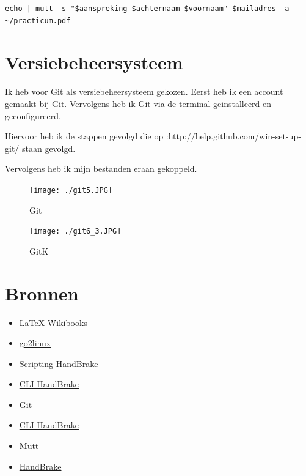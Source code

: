 \documentclass[12pt,a4paper]{article}
\begin{document}
\begin{titlepage}
\begin{center}
\begin{verbatim}
echo | mutt -s "$aanspreking $achternaam $voornaam" $mailadres -a ~/practicum.pdf

\end{verbatim}

\section{Versiebeheersysteem}
Ik heb voor Git als versiebeheersysteem gekozen.
Eerst heb ik een account gemaakt bij Git. Vervolgens heb ik Git via de terminal geinstalleerd en geconfigureerd.

Hiervoor heb ik de stappen gevolgd die op :http://help.github.com/win-set-up-git/ staan gevolgd.

Vervolgens heb ik mijn bestanden eraan gekoppeld.

\begin{figure}[h]
\begin{center}

\texttt{[image: ./git5.JPG]}
\caption{\label{fig4}Git}
\end{center}
\end{figure}

\begin{figure}[h]
\begin{center}

\texttt{[image: ./git6\_3.JPG]}
\caption{\label{fig5}GitK}
\end{center}
\end{figure}

\section{Bronnen}
\begin{itemize}
\item \href{http://nl.wikibooks.org/wiki/LaTeX}{\LaTeX{} Wikibooks} 
\item \href{http://www.go2linux.org/linux/2010/10/how-send-email-command-line-gmail-mutt-789}{go2linux} 
\item \href{http://www.surlyjake.com/2010/06/script-to-run-handbrake-on-an-entire-folder/}{Scripting HandBrake} 
\item \href{https://trac.handbrake.fr/wiki/CLIGuide/}{CLI HandBrake} 
\item \href{http://help.github.com/win-set-up-git/}{Git}
\item \href{https://trac.handbrake.fr/wiki/CLIGuide/}{CLI HandBrake} 
\item \href{http://pastebin.com/HGTXa9S3/}{Mutt}
\item \href{http://handbrake.fr/}{HandBrake}

\end{itemize}
\end{center}
\end{titlepage}
\end{document}
